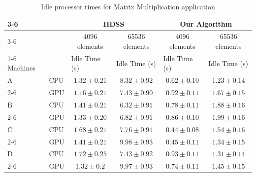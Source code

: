 \documentclass[journal]{IEEEtran}
\begin{document}
\begin{table}[htb]
\centering
\caption{Idle processor times for Matrix Multiplication application}
\begin{scriptsize}
\begin{tabular}{|l|l|l|l|l|l|}
\cline{3-6}
\multicolumn{1}{l}{} &  & \multicolumn{2}{c|}{HDSS} & \multicolumn{2}{c|}{Our Algorithm} \\ 
\cline{3-6}
\multicolumn{1}{l}{} &  & \multicolumn{1}{c|}{4096 elements} & \multicolumn{1}{c|}{65536 elements} & \multicolumn{1}{c|}{4096 elements} & \multicolumn{1}{c|}{65536 elements} \\ 
\cline{1-6}
\multicolumn{1}{|c}{} Machines &  & Idle Time (s) & Idle Time (s) & Idle Time (s) & Idle Time (s) \\ 
\hline
A & CPU & \multicolumn{1}{c|}{$1.32 \pm 0.21$} & \multicolumn{1}{c|}{$8.32  \pm 0.92$} & \multicolumn{1}{c|}{$0.62  \pm 0.10$} & \multicolumn{1}{c|}{$1.23 \pm 0.14$} \\ 
\cline{2-6}
 & GPU & \multicolumn{1}{c|}{$1.16 \pm 0.21$} & \multicolumn{1}{c|}{$7.43 \pm 0.90$} & \multicolumn{1}{c|}{$0.92 \pm 0.11$} & \multicolumn{1}{c|}{$1.67 \pm 0.15$} \\ 
\hline
B & CPU & \multicolumn{1}{c|}{$1.41 \pm 0.21$} & \multicolumn{1}{c|}{$6.32 \pm 0.91$} & \multicolumn{1}{c|}{$0.78 \pm 0.11$} & \multicolumn{1}{c|}{$1.88 \pm0.16$} \\ 
\cline{2-6}
 & GPU & \multicolumn{1}{c|}{$1.33 \pm 0.20$} & \multicolumn{1}{c|}{$6.82 \pm 0.91$} & \multicolumn{1}{c|}{$0.86 \pm 0.10$} & \multicolumn{1}{c|}{$1.99 \pm 0.16$} \\ 
\hline
C & CPU & \multicolumn{1}{c|}{$1.68 \pm 0.21$} & \multicolumn{1}{c|}{$7.76 \pm 0.91$} & \multicolumn{1}{c|}{$0.44 \pm 0.08$} & \multicolumn{1}{c|}{$1.54 \pm 0.16$} \\ 
\cline{2-6}
 & GPU & \multicolumn{1}{c|}{$1.41 \pm 0.21$} & \multicolumn{1}{c|}{$9.98 \pm 0.93$} & \multicolumn{1}{c|}{$0.45 \pm 0.11$} & \multicolumn{1}{c|}{$1.34 \pm 0.15$} \\ 
\hline
D & CPU & \multicolumn{1}{c|}{$1.72 \pm 0.25$} & \multicolumn{1}{c|}{$7.43 \pm 0.92$} & \multicolumn{1}{c|}{$0.93 \pm 0.11$} & \multicolumn{1}{c|}{$1.31 \pm 0.14$} \\ 
\cline{2-6}
 & GPU & \multicolumn{1}{c|}{$1.32 \pm 0.2$} & \multicolumn{1}{c|}{$9.97 \pm 0.93$} & \multicolumn{1}{c|}{$0.74 \pm 0.11$} & \multicolumn{1}{c|}{$1.45 \pm 0.15$} \\ 
\hline
\end{tabular}
\end{scriptsize}
\label{table: ociosoBlocos}
\end{table}
\end{document}
